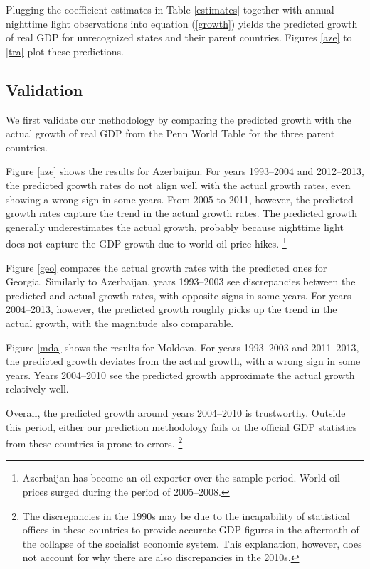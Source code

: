 \documentclass[12pt,a4paper]{article}%
\begin{document}
Plugging the coefficient estimates in Table \ref{estimates} together with annual nighttime light observations into equation (\ref{growth}) yields the predicted growth of real GDP for unrecognized states and their parent countries. 
Figures \ref{aze} to \ref{tra} plot these predictions.

\subsection{Validation}\label{validation}
We first validate our methodology by comparing the predicted growth with the actual growth of real GDP from the Penn World Table for the three parent countries. 

Figure \ref{aze} shows the results for Azerbaijan.
For years 1993--2004 and 2012--2013, the predicted growth rates do not align well with the actual growth rates, even showing a wrong sign in some years. 
From 2005 to 2011, however, the predicted growth rates capture the trend in the actual growth rates. 
The predicted growth generally underestimates the actual growth, probably because nighttime light does not capture the GDP growth due to world oil price hikes.%
\footnote{
	Azerbaijan has become an oil exporter over the sample period. 	
	World oil prices surged during the period of 2005--2008. 
}

Figure \ref{geo} compares the actual growth rates with the predicted ones for Georgia. 
Similarly to Azerbaijan, years 1993--2003 see discrepancies between the predicted and actual growth rates, with opposite signs in some years. 
For years 2004--2013, however, the predicted growth roughly picks up the trend in the actual growth, with the magnitude also comparable.

Figure \ref{mda} shows the results for Moldova.
For years 1993--2003 and 2011--2013, the predicted growth deviates from the actual growth, with a wrong sign in some years.
Years 2004--2010 see the predicted growth approximate the actual growth relatively well.

Overall, the predicted growth around years 2004--2010 is trustworthy. 
Outside this period, either our prediction methodology fails or the official GDP statistics from these countries is prone to errors.%
\footnote{
	The discrepancies in the 1990s may be due to the incapability of statistical offices in these countries to provide accurate GDP figures in the aftermath of the collapse of the socialist economic system. 
	This explanation, however, does not account for why there are also discrepancies in the 2010s.
}
\end{document}
